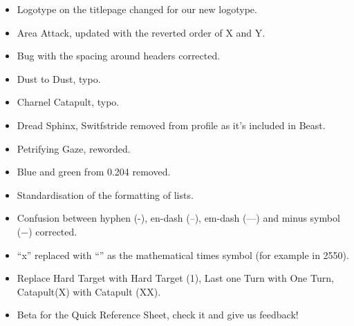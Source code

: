 
\subtitle{0.205.2}

\begin{itemize}
\item Logotype on the titlepage changed for our new logotype.
\item Area Attack, updated with the reverted order of X and Y.
\item Bug with the spacing around headers corrected.
\item Dust to Dust, typo.
\item Charnel Catapult, typo.
\end{itemize}

\subtitle{0.205.1}

\begin{itemize}
\item Dread Sphinx, Switfstride removed from profile as it's included in Beast.
\item Petrifying Gaze, reworded.
\end{itemize}

\subtitle{0.205.0}

\begin{itemize}
\item Blue and green from 0.204 removed.
\item Standardisation of the formatting of lists.
\item Confusion between hyphen (-), en-dash (--), em-dash (---) and minus symbol (−) corrected.
\item \enquote{x} replaced with \enquote{\timess{}} as the mathematical times symbol (for example in 25\timess{}50).
\item Replace Hard Target with Hard Target (1), Last one Turn with One Turn, Catapult(X) with Catapult (X\timess{}X).
\item Beta for the Quick Reference Sheet, check it and give us feedback!
\end{itemize}


